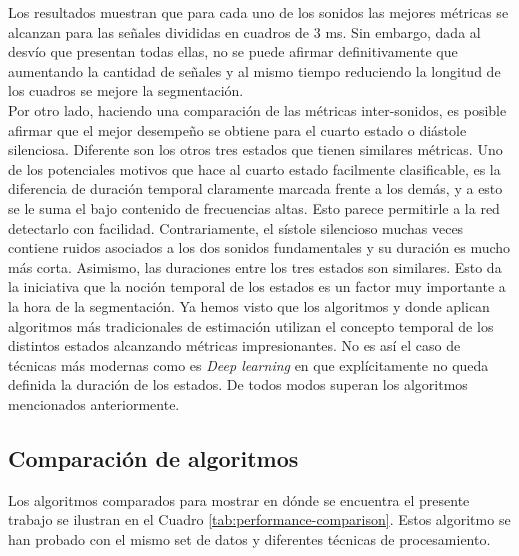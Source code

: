 \indent Los resultados muestran que para cada uno de los sonidos las mejores métricas se alcanzan para las señales divididas en cuadros de 3 ms. Sin embargo, dada al desvío que presentan todas ellas, no se puede afirmar definitivamente que aumentando la cantidad de señales y al mismo tiempo reduciendo la longitud de los cuadros se mejore la segmentación. \\
\indent Por otro lado, haciendo una comparación de las métricas inter-sonidos, es posible afirmar que el mejor desempeño se obtiene para el cuarto estado o diástole silenciosa. Diferente son los otros tres estados que tienen similares métricas. Uno de los potenciales motivos que hace al cuarto estado facilmente clasificable, es la diferencia de duración temporal claramente marcada frente a los demás, y a esto se le suma el bajo contenido de frecuencias altas. Esto parece permitirle a la red detectarlo con facilidad. Contrariamente, el sístole silencioso muchas veces contiene ruidos asociados a los dos sonidos fundamentales y su duración es mucho más corta. Asimismo, las duraciones entre los tres estados son similares. Esto da la iniciativa que la noción temporal de los estados es un factor muy importante a la hora de la segmentación. Ya hemos visto que los algoritmos \cite{pp:schmidt2010} y \cite{pp:springer2015} donde aplican algoritmos más tradicionales de estimación utilizan el concepto temporal de los distintos estados alcanzando métricas impresionantes. No es así el caso de técnicas más modernas como es \textit{Deep learning} en \cite{pp:renna2018} que explícitamente no queda definida la duración de los estados. De todos modos superan los algoritmos mencionados anteriormente.


\subsection*{Comparación de algoritmos}

\indent Los algoritmos comparados para mostrar en dónde se encuentra el presente trabajo se ilustran en el Cuadro \ref{tab:performance-comparison}. Estos algoritmo se han probado con el mismo set de datos y diferentes técnicas de procesamiento.

